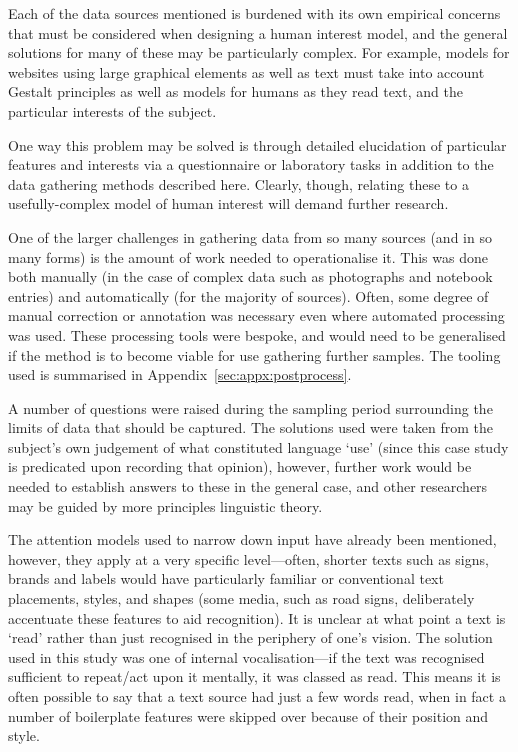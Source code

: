 Each of the data sources mentioned is burdened with its own empirical concerns that must be considered when designing a human interest model, and the general solutions for many of these may be particularly complex.  For example, models for websites using large graphical elements as well as text must take into account Gestalt principles as well as models for humans as they read text, and the particular interests of the subject.

One way this problem may be solved is through detailed elucidation of particular features and interests via a questionnaire or laboratory tasks in addition to the data gathering methods described here.  Clearly, though, relating these to a usefully-complex model of human interest will demand further research.




One of the larger challenges in gathering data from so many sources (and in so many forms) is the amount of work needed to operationalise it.  This was done both manually (in the case of complex data such as photographs and notebook entries) and automatically (for the majority of sources).  Often, some degree of manual correction or annotation was necessary even where automated processing was used.  These processing tools were bespoke, and would need to be generalised if the method is to become viable for use gathering further samples.  The tooling used is summarised in Appendix~\ref{sec:appx:postprocess}.



A number of questions were raised during the sampling period surrounding the limits of data that should be captured.  The solutions used were taken from the subject's own judgement of what constituted language `use' (since this case study is predicated upon recording that opinion), however, further work would be needed to establish answers to these in the general case, and other researchers may be guided by more principles linguistic theory.


The attention models used to narrow down input have already been mentioned, however, they apply at a very specific level---often, shorter texts such as signs, brands and labels would have particularly familiar or conventional text placements, styles, and shapes (some media, such as road signs, deliberately accentuate these features to aid recognition).  It is unclear at what point a text is `read' rather than just recognised in the periphery of one's vision.  The solution used in this study was one of internal vocalisation---if the text was recognised sufficient to repeat/act upon it mentally, it was classed as read.  This means it is often possible to say that a text source had just a few words read, when in fact a number of boilerplate features were skipped over because of their position and style.


